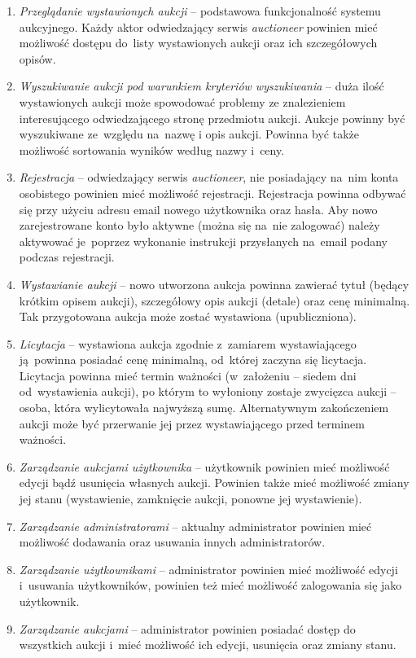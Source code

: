 \begin{enumerate}
  \item \textit{Przeglądanie wystawionych aukcji} -- podstawowa funkcjonalność systemu aukcyjnego. Każdy aktor odwiedzający serwis \textit{auctioneer} powinien mieć możliwość dostępu do~listy wystawionych aukcji oraz ich szczegółowych opisów.
  \item \textit{Wyszukiwanie aukcji pod warunkiem kryteriów wyszukiwania} -- duża ilość wystawionych aukcji może spowodować problemy ze znalezieniem interesującego odwiedzającego stronę przedmiotu aukcji. Aukcje powinny być wyszukiwane ze~względu na~nazwę i opis aukcji. Powinna być także możliwość sortowania wyników według nazwy i~ceny.
  \item \textit{Rejestracja} -- odwiedzający serwis \textit{auctioneer}, nie posiadający na~nim konta osobistego powinien mieć możliwość rejestracji. Rejestracja powinna odbywać się przy użyciu adresu email nowego użytkownika oraz hasła. Aby nowo zarejestrowane konto było aktywne (można się na~nie zalogować) należy aktywować je~poprzez wykonanie instrukcji przysłanych na~email podany podczas rejestracji.
  \item \textit{Wystawianie aukcji} -- nowo utworzona aukcja powinna zawierać tytuł (będący krótkim opisem aukcji), szczegółowy opis aukcji (detale) oraz cenę minimalną. Tak przygotowana aukcja może zostać wystawiona (upubliczniona).
  \item \textit{Licytacja} -- wystawiona aukcja zgodnie z~zamiarem wystawiającego ją~powinna posiadać cenę minimalną, od~której zaczyna się licytacja. Licytacja powinna mieć termin ważności (w~założeniu -- siedem dni od~wystawienia aukcji), po którym to wyłoniony zostaje zwycięzca aukcji -- osoba, która wylicytowała najwyższą sumę. Alternatywnym zakończeniem aukcji może być przerwanie jej przez wystawiającego przed terminem ważności.
  \item \textit{Zarządzanie aukcjami użytkownika} -- użytkownik powinien mieć możliwość edycji bądź usunięcia własnych aukcji. Powinien także mieć możliwość zmiany jej stanu (wystawienie, zamknięcie aukcji, ponowne jej wystawienie).
  \item \textit{Zarządzanie administratorami} -- aktualny administrator powinien mieć możliwość dodawania oraz usuwania innych administratorów.
  \item \textit{Zarządzanie użytkownikami} -- administrator powinien mieć możliwość edycji i~usuwania użytkowników, powinien też mieć możliwość zalogowania się jako użytkownik.
  \item \textit{Zarządzanie aukcjami} -- administrator powinien posiadać dostęp do wszystkich aukcji i~mieć możliwość ich edycji, usunięcia oraz zmiany stanu.
\end{enumerate}

